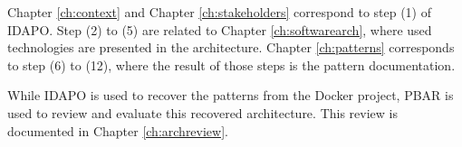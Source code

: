 Chapter \ref{ch:context} and Chapter \ref{ch:stakeholders} correspond to step
(1) of IDAPO. Step (2) to (5) are related to Chapter \ref{ch:softwarearch},
where used technologies are presented in the architecture. Chapter
\ref{ch:patterns} corresponds to step (6) to (12), where the result of those
steps is the pattern documentation.

While IDAPO is used to recover the patterns from the Docker project, PBAR is used to review and evaluate this recovered architecture. This review is documented in Chapter \ref{ch:archreview}.



